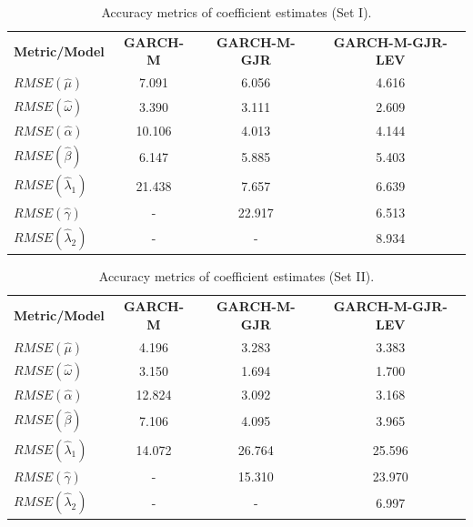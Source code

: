 \documentclass[authoryear, 1p]{elsarticle}
\numberwithin{equation}{section}
\begin{document}
\begin{table}[h!]
\centering
\caption{Accuracy metrics of coefficient estimates (Set I).}
\label{tab:tab_2}
\begin{tabular}{lccc}
\hline
\hline
\textbf{Metric/Model}                 & \textbf{GARCH-M} & \textbf{GARCH-M-GJR} & \textbf{GARCH-M-GJR-LEV} \\
$RMSE(\hat{\mu})$                    & 7.091     & 6.056      & 4.616           \\
$RMSE(\hat{\omega})$                 & 3.390     & 3.111      & 2.609           \\
$RMSE(\hat{\alpha})$                 & 10.106    & 4.013      & 4.144           \\
$RMSE(\hat{\beta})$                  & 6.147     & 5.885      & 5.403           \\
$RMSE(\hat{\lambda}_1)$              & 21.438    & 7.657      & 6.639           \\
$RMSE(\hat{\gamma})$                 & -         & 22.917     & 6.513           \\
$RMSE(\hat{\lambda}_2)$              & -         & -          & 8.934           \\    
\hline
\hline
\end{tabular}
\end{table}

\begin{table}[h!]
\centering
\caption{Accuracy metrics of coefficient estimates (Set II).}
\label{tab:tab_2_1}
\begin{tabular}{lccc}
\hline
\hline
\textbf{Metric/Model} & \textbf{GARCH-M} & \textbf{GARCH-M-GJR} & \textbf{GARCH-M-GJR-LEV} \\
$RMSE(\hat{\mu})$        & 4.196          & 3.283               & 3.383                    \\
$RMSE(\hat{\omega})$     & 3.150          & 1.694               & 1.700                    \\
$RMSE(\hat{\alpha})$     & 12.824         & 3.092               & 3.168                    \\
$RMSE(\hat{\beta})$      & 7.106          & 4.095               & 3.965                    \\
$RMSE(\hat{\lambda}_1)$  & 14.072         & 26.764              & 25.596                   \\
$RMSE(\hat{\gamma})$     & -              & 15.310              & 23.970                   \\
$RMSE(\hat{\lambda}_2)$  & -              & -                   & 6.997                    \\
\hline
\hline
\end{tabular}
\end{table}
\end{document}

